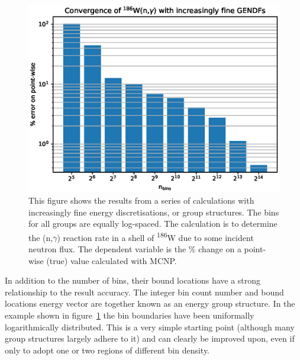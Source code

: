 \begin{figure}[H]
  \centering
  \includegraphics[width=0.9\linewidth]{gendf_convergence}
  \caption{This figure shows the results from a series of calculations with increasingly fine energy discretisations, or group structures. The bins for all groups are equally log-spaced. The calculation is to determine the (n,$\gamma$) reaction rate in a shell of \textsuperscript{186}W due to some incident neutron flux. The dependent variable is the \% change on a point-wise (true) value calculated with MCNP.}
  \label{fig:gendf_convergence}
\end{figure}

In addition to the number of bins, their bound locations have a strong relationship to the result accuracy. The integer bin count number and bound locations energy vector are together known as an energy group structure. In the example shown in figure~\ref{fig:gendf_convergence} the bin boundaries have been uniformally logarithmically distributed. This is a very simple starting point (although many group structures largely adhere to it) and can clearly be improved upon, even if only to adopt one or two regions of different bin density.

